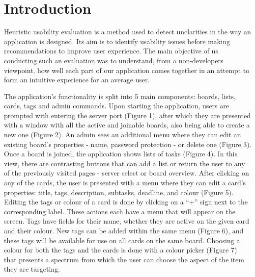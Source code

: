 \section{Introduction}

Heuristic usability evaluation is a method used to detect unclarities in the way an application is designed. Its aim is to identify usability issues before making recommendations to improve user experience. The main objective of us conducting such an evaluation was to understand, from a non-developers viewpoint, how well each part of our application comes together in an attempt to form an intuitive experience for an average user.

The application’s functionality is split into 5 main components: boards, lists, cards, tags and admin commands. Upon starting the application, users are prompted with entering the server port (Figure 1), after which they are presented with a window with all the active and joinable boards, also being able to create a new one (Figure 2). An admin sees an additional menu where they can edit an existing board’s properties - name, password protection - or delete one (Figure 3). Once a board is joined, the application shows lists of tasks (Figure 4). In this view, there are contrasting buttons that can add a list or return the user to any of the previously visited pages - server select or board overview. After clicking on any of the cards, the user is presented with a menu where they can edit a card’s properties: title, tags, description, subtasks, deadline, and colour (Figure 5). Editing the tags or colour of a card is done by clicking on a “+” sign next to the corresponding label. These actions each have a menu that will appear on the screen. Tags have fields for their name, whether they are active on the given card and their colour. New tags can be added within the same menu (Figure 6), and these tags will be available for use on all cards on the same board. Choosing a colour for both the tags and the cards is done with a colour picker (Figure 7) that presents a spectrum from which the user can choose the aspect of the item they are targeting.